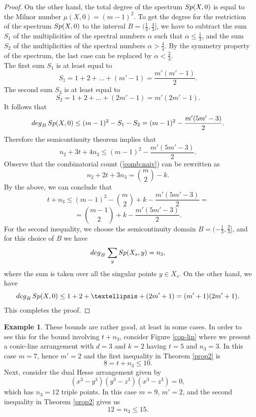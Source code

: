 \documentclass[12pt]{amsart}
\theoremstyle{plain}
\theoremstyle{definition}
\newtheorem{ex}[subsection]{Example}
\numberwithin{equation}{section}
\begin{document}
\begin{proof}
On the other hand, the total degree of the spectrum ${\rm Sp}(X,0)$ is equal to the Milnor number $\mu(X,0)=(m-1)^2$. To get the degree for the restriction of the spectrum ${\rm Sp}(X,0)$ to the interval $B=(\frac{1}{3},\frac{4}{3}]$, we have to subtract the sum $S_1$ of the multiplicities of the spectral numbers $\alpha$
such that  $\alpha\leq \frac{1}{3}$, and the sum $S_2$ of the multiplicities of the spectral numbers $\alpha > \frac{4}{3}$. By the symmetry property of the spectrum, the last case can be replaced by $\alpha < \frac{2}{3}$. \\
The first sum $S_1$ is at least equal to
$$S_1 = 1 + 2 + \ldots + (m'-1)=\frac{m'(m'-1)}{2}.$$
The second sum $S_2$ is at least equal to
$$S_2 = 1 + 2 +\ldots + (2m'-1)=m'(2m'-1).$$
It follows that
\begin{equation}
\label{E7}
{\rm deg}_B \, {\rm Sp}(X,0) \leq (m-1)^2 - S_1 - S_2 =(m-1)^2-\frac{m'(5m'-3)}{2}.
\end{equation}
Therefore the semicontinuity theorem implies that
\begin{equation}
\label{E8}
n_2 + 3t + 4n_3 \leq (m-1)^2-\frac{m'(5m'-3)}{2}.
\end{equation}
Observe that the combinatorial count (\ref{comb:naiv}) can be rewritten as
\begin{equation}
\label{E4}
n_2 + 2t + 3n_3 = \binom{m}{2} - k.
\end{equation}
By the above, we can conclude that
$$t + n_3 \leq (m-1)^2- \binom{m}{2} + k -\frac{m'(5m'-3)}{2}=$$
$$= \binom{m-1}{2} + k -\frac{m'(5m'-3)}{2}.$$
For the second inequality, we choose the semicontinuity domain $B=(-\frac{1}{3},\frac{2}{3}]$, and for this choice of $B$ we have
\begin{equation}
\label{E9}
{\rm  deg}_B \, \sum_y {\rm Sp} (X_s,y) = n_3,
\end{equation}
where the sum is taken over all the singular points $y \in X_s$. On the other hand, we have
\begin{equation}
\label{E6}
{\rm deg}_B \, {\rm Sp}(X,0) \leq 1 + 2+ \ldots + (2m'+1)=(m'+1)(2m'+1).
\end{equation}
This completes the proof.
\end{proof}
\begin{ex}
\label{exH1}
These bounds are rather good, at least in some cases. In order to see this for the bound involving $t+n_3$, consider Figure \ref{con-lin} where we present a conic-line arrangement with $d=3$ and $k=2$ having $t=5$ and $n_3=3$. In this case $m=7$, hence $m'=2$ and the first inequality in Theorem \ref{prop2} is
$$8=t+n_3 \leq 10.$$
Next, consider the dual Hesse arrangement given by
$$(x^3-y^3)(y^3-z^3)(x^3-z^3)=0,$$
which has $n_3=12$ triple points. In this case $m=9$, $m'=2$, and the second inequality in Theorem \ref{prop2} gives us
$$12=n_3 \leq 15.$$
\end{ex}
\end{document}
